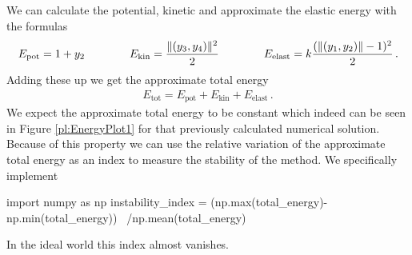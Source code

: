 \documentclass{scrartcl}
\DeclarePairedDelimiter{\norm}{\lVert}{\rVert}
\newcounter{constant}
\begin{document}
We can calculate the potential, kinetic and approximate the elastic energy with the formulas
\begin{align*}
	E_{\text{pot}}=1+y_2
	\qquad\qquad E_{\text{kin}}=\frac{\norm{(y_3,y_4)}^2}{2}
	\qquad\qquad E_{\text{elast}}=k\frac{(\norm{(y_1,y_2)}-1)^2}{2}\,.
\end{align*}
Adding these up we get the approximate total energy
\begin{align*}
	E_{\text{tot}}=E_{\text{pot}}+E_{\text{kin}}+E_{\text{elast}}\,.
\end{align*}
We expect the approximate total energy to be constant which indeed can be seen in Figure \ref{pl:EnergyPlot1} for that previously calculated numerical solution.
Because of this property we can use the relative variation of the approximate total energy as an index to measure the stability of the method. We specifically implement
\begin{python}
import numpy as np
instability_index = (np.max(total_energy)-np.min(total_energy)) \
				              /np.mean(total_energy)
\end{python}
In the ideal world this index almost vanishes.
\end{document}
